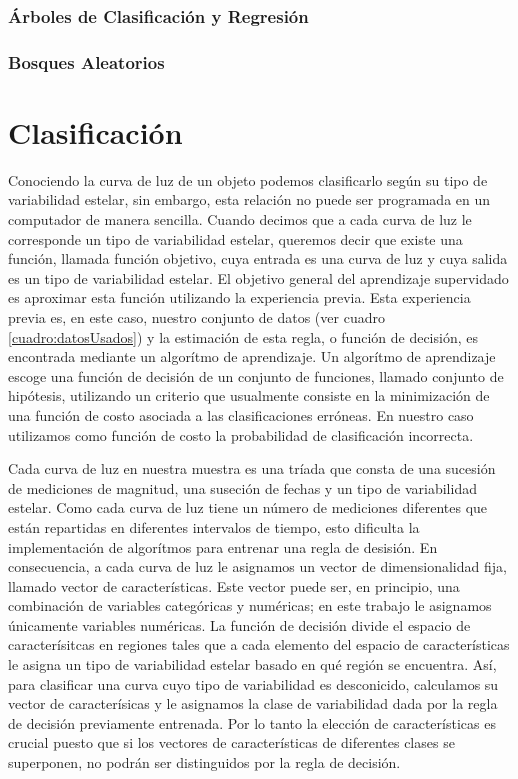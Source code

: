 \documentclass[letterpaper,12pt]{book}
\begin{document}
\subsection{Árboles de Clasificación y Regresión}

\subsection{Bosques Aleatorios}

\chapter{Clasificación}\label{cap:clasificacion} 

Conociendo la curva de luz de un objeto podemos clasificarlo según su tipo de variabilidad estelar, sin embargo, esta relación no puede ser programada en un computador de manera sencilla. Cuando decimos que a cada curva de luz le corresponde un tipo de variabilidad estelar, queremos decir que existe una función, llamada función objetivo, cuya entrada es una curva de luz y cuya salida es un tipo de variabilidad estelar. El objetivo general del aprendizaje supervidado es aproximar esta función utilizando la experiencia previa. Esta experiencia previa es, en este caso, nuestro conjunto de datos (ver cuadro \ref{cuadro:datosUsados}) y la estimación de esta regla, o función de decisión, es encontrada mediante un algorítmo de aprendizaje. Un algorítmo de aprendizaje escoge una función de decisión de un conjunto de funciones, llamado conjunto de hipótesis, utilizando un criterio que usualmente consiste en la minimización de una función de costo asociada a las clasificaciones erróneas. En nuestro caso utilizamos como función de costo la probabilidad de clasificación incorrecta.

Cada curva de luz en nuestra muestra es una tríada que consta de una sucesión de mediciones de magnitud, una suseción de fechas y un tipo de variabilidad estelar. Como cada curva de luz tiene un número de mediciones diferentes que están repartidas en diferentes intervalos de tiempo, esto dificulta la implementación de algorítmos para entrenar una regla de desisión. En consecuencia, a cada curva de luz le asignamos un vector de dimensionalidad fija, llamado vector de características. Este vector puede ser, en principio, una combinación de variables categóricas y numéricas; en este trabajo le asignamos únicamente variables numéricas. La función de decisión divide el espacio de caracterísitcas en regiones tales que a cada elemento del espacio de características le asigna un tipo de variabilidad estelar basado en qué región se encuentra. Así, para clasificar una curva cuyo tipo de variabilidad es desconicido, calculamos su vector de caracterísicas y le asignamos la clase de variabilidad dada por la regla de decisión previamente entrenada. Por lo tanto la elección de características es crucial puesto que si los vectores de características de diferentes clases se superponen, no podrán ser distinguidos por la regla de decisión.
\end{document}
